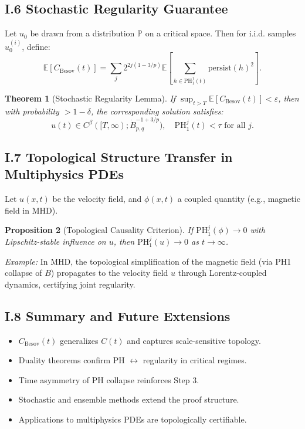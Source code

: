 \documentclass[11pt]{article}
\newtheorem{theorem}{Theorem}[section]
\newtheorem{proposition}[theorem]{Proposition}
\theoremstyle{definition}
\begin{document}
\subsection*{I.6 Stochastic Regularity Guarantee}
Let $u_0$ be drawn from a distribution $\mathbb{P}$ on a critical space. Then for i.i.d. samples $u_0^{(i)}$, define:
\[
\mathbb{E}[C_{\mathrm{Besov}}(t)] = \sum_j 2^{2j(1-3/p)} \mathbb{E}\left[ \sum_{h \in \mathrm{PH}^j_1(t)} \mathrm{persist}(h)^2 \right].
\]
\begin{theorem}[Stochastic Regularity Lemma]
If $\sup_{t > T} \mathbb{E}[C_{\mathrm{Besov}}(t)] < \varepsilon$, then with probability $> 1 - \delta$, the corresponding solution satisfies:
\[
u(t) \in C^\beta([T,\infty); \dot{B}^{-1+3/p}_{p,q}), \quad \mathrm{PH}^j_1(t) < \tau \text{ for all } j.\]
\end{theorem}

\subsection*{I.7 Topological Structure Transfer in Multiphysics PDEs}
Let $u(x,t)$ be the velocity field, and $\phi(x,t)$ a coupled quantity (e.g., magnetic field in MHD).
\begin{proposition}[Topological Causality Criterion]
If $\mathrm{PH}_1^j(\phi) \to 0$ with Lipschitz-stable influence on $u$, then $\mathrm{PH}_1^j(u) \to 0$ as $t \to \infty$.
\end{proposition}
\textit{Example:} In MHD, the topological simplification of the magnetic field (via PH1 collapse of $B$) propagates to the velocity field $u$ through Lorentz-coupled dynamics, certifying joint regularity.

\subsection*{I.8 Summary and Future Extensions}
\begin{itemize}
  \item $C_{\mathrm{Besov}}(t)$ generalizes $C(t)$ and captures scale-sensitive topology.
  \item Duality theorems confirm PH \ensuremath{\leftrightarrow} regularity in critical regimes.
  \item Time asymmetry of PH collapse reinforces Step 3.
  \item Stochastic and ensemble methods extend the proof structure.
  \item Applications to multiphysics PDEs are topologically certifiable.
\end{itemize}
\end{document}
